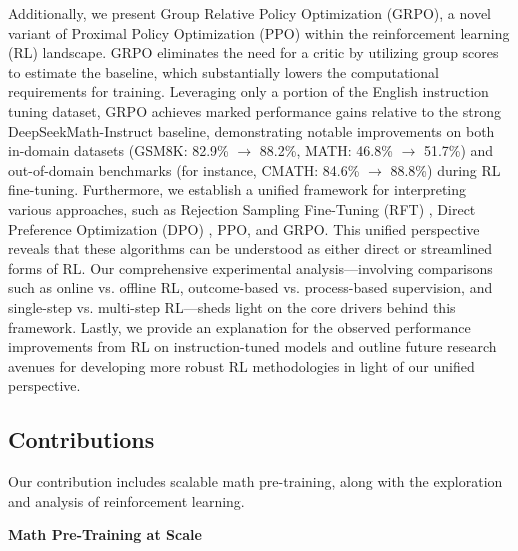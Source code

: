 Additionally, we present Group Relative Policy Optimization (GRPO), a novel variant of Proximal Policy Optimization (PPO) \citep{schulman2017proximal} within the reinforcement learning (RL) landscape. GRPO eliminates the need for a critic by utilizing group scores to estimate the baseline, which substantially lowers the computational requirements for training. Leveraging only a portion of the English instruction tuning dataset, GRPO achieves marked performance gains relative to the strong DeepSeekMath-Instruct baseline, demonstrating notable improvements on both in-domain datasets (GSM8K: 82.9\% $\rightarrow$ 88.2\%, MATH: 46.8\% $\rightarrow$ 51.7\%) and out-of-domain benchmarks (for instance, CMATH: 84.6\% $\rightarrow$ 88.8\%) during RL fine-tuning. Furthermore, we establish a unified framework for interpreting various approaches, such as Rejection Sampling Fine-Tuning (RFT) \citep{yuan2023scaling}, Direct Preference Optimization (DPO) \citep{dpo}, PPO, and GRPO. This unified perspective reveals that these algorithms can be understood as either direct or streamlined forms of RL. Our comprehensive experimental analysis—involving comparisons such as online vs. offline RL, outcome-based vs. process-based supervision, and single-step vs. multi-step RL—sheds light on the core drivers behind this framework. Lastly, we provide an explanation for the observed performance improvements from RL on instruction-tuned models and outline future research avenues for developing more robust RL methodologies in light of our unified perspective.

\subsection{Contributions}
Our contribution includes scalable math pre-training, along with the exploration and analysis of reinforcement learning.

\textbf{Math Pre-Training at Scale}

